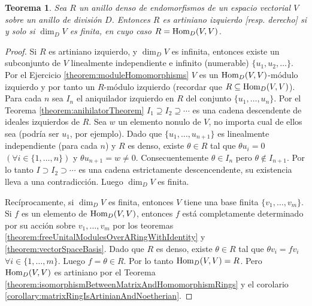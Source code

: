 \documentclass{report}
\newcommand{\Hom}{\textnormal{Hom}}
\newtheorem{theorem}{Teorema}
\begin{document}
  \begin{theorem}
    \label{theorem:leftArtinianDenseEndomorphismRingsOfVectorSpaces}
    Sea \(R\) un anillo denso de endomorfismos de un espacio vectorial \(V\) sobre un anillo de división \(D\).
    Entonces \(R\) es artiniano izquierdo [resp. derecho] si y solo si \(\dim_D V\) es finita, en cuyo caso \(R = \Hom_D(V, V)\).
  \end{theorem}
  \begin{proof}
    Si \(R\) es artiniano izquierdo, y \(\dim_D V\) es infinita, entonces existe un subconjunto de \(V\) linealmente independiente e infinito (numerable) \(\{u_1, u_2, \dots\}\).
    Por el Ejercicio \ref{theorem:moduleHomomorphisms} \(V\) es un \(\Hom_D(V, V)\)-módulo izquierdo y por tanto un \(R\)-módulo izquierdo (recordar que \(R \subseteq \Hom_D(V, V)\)).
    Para cada \(n\) sea \(I_n\) el aniquilador izquierdo en \(R\) del conjunto \(\{u_1, \dots, u_n\}\).
    Por el Teorema \ref{theorem:anihilatorTheorem} \(I_1 \supseteq I_2 \supseteq \cdots\) es una cadena descendente de ideales izquierdos de \(R\).
    Sea \(w\) un elemento nonulo de \(V\), no importa cual de ellos sea (podría ser \(u_1\), por ejemplo).
    Dado que \(\{u_1, \dots, u_{n + 1}\}\) es linealmente independiente (para cada \(n\)) y \(R\) es denso, existe \(\theta \in R\) tal que \(\theta u_i = 0\) \((\forall i \in \{1, \dots, n\})\) y \(\theta u_{n + 1} = w \neq 0\).
    Consecuentemente \(\theta \in I_n\) pero \(\theta \notin I_{n + 1}\).
    Por lo tanto \(I \supset I_2 \supset \cdots\) es una cadena estrictamente descencendente, su existencia lleva a una contradicción.
    Luego \(\dim_D V\) es finita.

    Recíprocamente, si \(\dim_D V\) es finita, entonces \(V\) tiene una base finita \(\{v_1, \dots, v_m\}\).
    Si \(f\) es un elemento de \(\Hom_D(V, V)\), entonces \(f\) está completamente determinado por su acción sobre \(v_1, \dots, v_m\) por los teoremas \ref{theorem:freeUnitalModulesOverARingWithIdentity} y \ref{theorem:vectorSpaceBasis}.
    Dado que \(R\) es denso, existe \(\theta \in R\) tal que \(\theta v_i = f v_i\) \(\forall i \in \{1, \dots, m\}\).
    Luego \(f = \theta \in R\).
    Por lo tanto \(\Hom_D(V, V) = R\).
    Pero \(\Hom_D(V, V)\) es artiniano por el Teorema \ref{theorem:isomorphismBetweenMatrixAndHomomorphismRings} y el corolario \ref{corollary:matrixRingIsArtinianAndNoetherian}.
  \end{proof}
\end{document}
